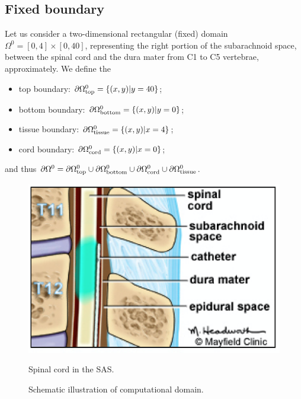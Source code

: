 \documentclass[a4paper,11pt,openright,twoside]{book}
\begin{document}
\subsection{Fixed boundary}
Let us consider a two-dimensional rectangular (fixed) domain $\Omega^0 = [0, 4]
\times [0, 40]$, representing the right portion of the subarachnoid space, between the spinal cord and the dura mater from C1 to C5 vertebrae, approximately. We define the
\begin{itemize}
\item
  top boundary: $\partial \Omega_{\rm top}^0 = \{ (x, y) | y = 40\}$;
\item
  bottom boundary: $\partial \Omega_{\rm bottom}^0 = \{ (x, y) | y = 0\}$;
\item
  tissue boundary: $\partial \Omega_{\rm tissue}^0 = \{ (x, y) | x = 4\}$;
\item
  cord boundary: $\partial \Omega_{\rm cord}^0 = \{ (x, y) | x = 0\}$;
\end{itemize}
and thus $\partial \Omega^0 = \partial \Omega_{\rm top}^0 \cup
\partial \Omega_{\rm bottom}^0 \cup \partial \Omega_{\rm cord}^0 \cup
\partial \Omega_{\rm tissue}^0$.



\begin{figure}[h!]
\begin{minipage}[b]{.5\textwidth}
\centering
\includegraphics[width=.9\textwidth]{images/sas2}
\caption{Spinal cord in the SAS.}
\label{img:cns:3}
\end{minipage}
\begin{minipage}[b]{.4\textwidth}
\centering
{}
\caption{Schematic illustration of computational domain.}
\label{img:cns:4}
\end{minipage}
\end{figure}
\end{document}
